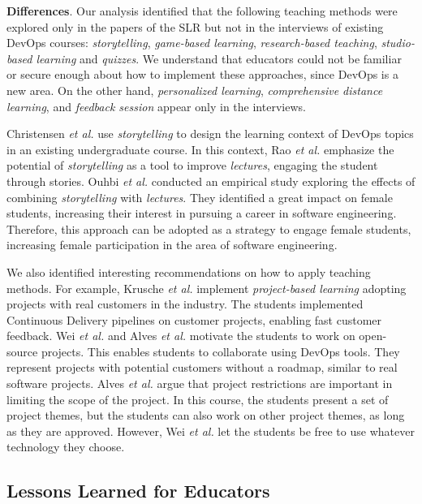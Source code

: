\documentclass[10pt,conference]{IEEEtran}
\begin{document}
\textbf{Differences}. Our analysis identified that the following teaching methods were explored only in the papers of the SLR but not in the interviews of existing DevOps courses: \textsl{storytelling}, \textsl{game-based learning}, \textsl{research-based teaching}, \textsl{studio-based learning} and \textsl{quizzes}. We understand that educators could not be familiar or secure enough about how to implement these approaches, since DevOps is a new area. On the other hand, \textsl{personalized learning}, \textsl{comprehensive distance learning}, and \textsl{feedback session} appear only in the interviews.

Christensen \textit{et al.} \cite{christensen:2018_pp, christensen:2016_pp} use \textsl{storytelling} to design the learning context of DevOps topics in an existing undergraduate course. In this context, Rao \textit{et al.} \cite{rao:2006} emphasize the potential of \textsl{storytelling} as a tool to improve \textsl{lectures}, engaging the student through stories. Ouhbi \textit{et al.} \cite{ouhbi:2021} conducted an empirical study exploring the effects of combining \textsl{storytelling} with \textsl{lectures}. They identified a great impact on female students, increasing their interest in pursuing a career in software engineering. Therefore, this approach can be adopted as a strategy to engage female students, increasing female participation in the area of software engineering.


We also identified interesting recommendations on how to apply teaching methods. For example, Krusche \textit{et al.} \cite{krusche:2014_pp} implement \textsl{project-based learning} adopting projects with real customers in the industry. The students implemented Continuous Delivery pipelines on customer projects, enabling fast customer feedback. Wei \textit{et al.} \cite{wei:2019_pp} and Alves \textit{et al.} \cite{alves:2021_pp} motivate the students to work on open-source projects. This enables students to collaborate using DevOps tools. They represent projects with potential customers without a roadmap, similar to real software projects. Alves \textit{et al.} argue that project restrictions are important in limiting the scope of the project. In this course, the students present a set of project themes, but the students can also work on other project themes, as long as they are approved. However, Wei \textit{et al.} let the students be free to use whatever technology they choose.

\subsection{Lessons Learned for Educators} 
\end{document}
